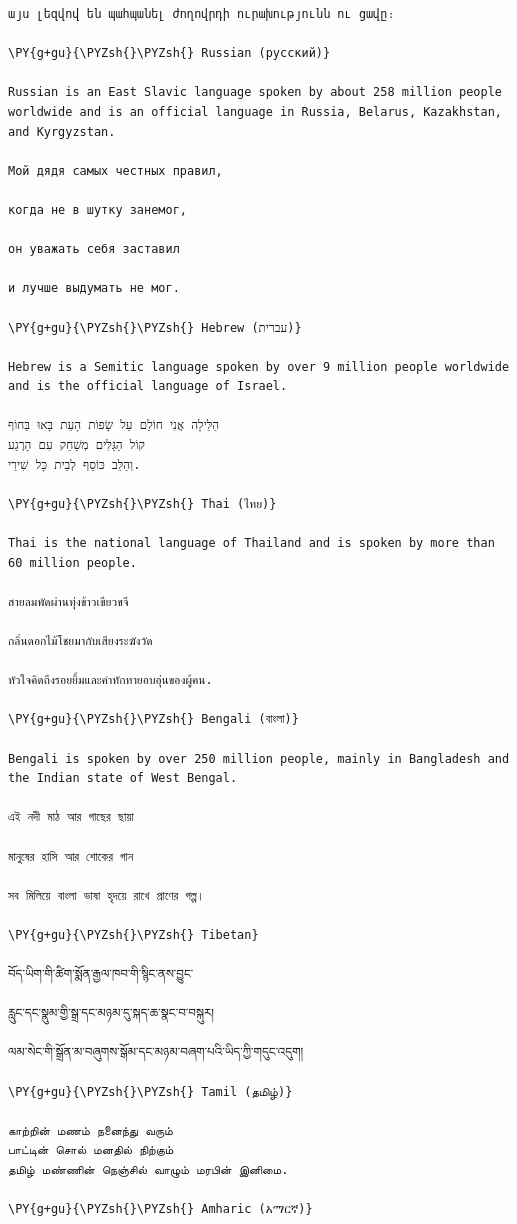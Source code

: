 \documentclass[a4paper,twoside]{article}
\begin{document}
\begin{tscode}[lang=markdown, engine=pygments]
\begin{Verbatim}[commandchars=\\\{\},breaklines, breakanywhere, commandchars=\\\{\}]
այս լեզվով են պահպանել ժողովրդի ուրախությունն ու ցավը։

\PY{g+gu}{\PYZsh{}\PYZsh{} Russian (русский)}

Russian is an East Slavic language spoken by about 258 million people worldwide and is an official language in Russia, Belarus, Kazakhstan, and Kyrgyzstan.

Мой дядя самых честных правил,

когда не в шутку занемог,

он уважать себя заставил

и лучше выдумать не мог.

\PY{g+gu}{\PYZsh{}\PYZsh{} Hebrew (עברית)}

Hebrew is a Semitic language spoken by over 9 million people worldwide and is the official language of Israel.

הַלֵּילָה אֲנִי חוֹלֵם עַל שָׂפוֹת הָעֵת בָּאוּ בַּחוֹף
קוֹל הַגַּלִּים מְשַׁחֵק עִם הָרֶגַע
וְהַלֵּב כּוֹסֵף לְבֵית כָּל שִׁירַי.

\PY{g+gu}{\PYZsh{}\PYZsh{} Thai (ไทย)}

Thai is the national language of Thailand and is spoken by more than 60 million people.

สายลมพัดผ่านทุ่งข้าวเขียวขจี

กลิ่นดอกไม้โชยมากับเสียงระฆังวัด

หัวใจคิดถึงรอยยิ้มและคำทักทายอบอุ่นของผู้คน.

\PY{g+gu}{\PYZsh{}\PYZsh{} Bengali (বাংলা)}

Bengali is spoken by over 250 million people, mainly in Bangladesh and the Indian state of West Bengal.

এই নদী মাঠ আর গাছের ছায়া

মানুষের হাসি আর শোকের গান

সব মিলিয়ে বাংলা ভাষা হৃদয়ে রাখে প্রাণের গল্প।

\PY{g+gu}{\PYZsh{}\PYZsh{} Tibetan}

བོད་ཡིག་གི་ཚིག་སྨོན་རྒྱལ་ཁབ་གི་སྙིང་ནས་བྱུང་

རླུང་དང་སྣུམ་གྱི་སྒྲ་དང་མཉམ་དུ་སྐད་ཆ་སྣང་བ་བསྐུར།

ལམ་སེང་གི་སྒྲོན་མ་བཞུགས་སྒོམ་དང་མཉམ་བཞག་པའི་ཡིད་ཀྱི་གདུང་འདུག།

\PY{g+gu}{\PYZsh{}\PYZsh{} Tamil (தமிழ்)}

காற்றின் மணம் நனைந்து வரும்
பாட்டின் சொல் மனதில் நிற்கும்
தமிழ் மண்ணின் நெஞ்சில் வாழும் மரபின் இனிமை.

\PY{g+gu}{\PYZsh{}\PYZsh{} Amharic (አማርኛ)}


\end{Verbatim}
\end{tscode}
\end{document}
